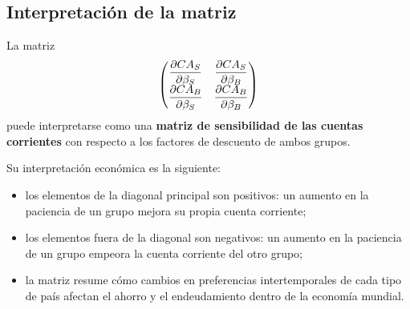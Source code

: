 \subsection*{Interpretación de la matriz}
La matriz
\[
\begin{pmatrix}
\dfrac{\partial CA_S}{\partial \beta_S} & \dfrac{\partial CA_S}{\partial \beta_B} \\
\dfrac{\partial CA_B}{\partial \beta_S} & \dfrac{\partial CA_B}{\partial \beta_B}
\end{pmatrix}
\]
puede interpretarse como una \textbf{matriz de sensibilidad de las cuentas corrientes} con respecto a los factores de descuento de ambos grupos.

Su interpretación económica es la siguiente:
\begin{itemize}[leftmargin=1.2cm]
    \item los elementos de la diagonal principal son positivos: un aumento en la paciencia de un grupo mejora su propia cuenta corriente;
    \item los elementos fuera de la diagonal son negativos: un aumento en la paciencia de un grupo empeora la cuenta corriente del otro grupo;
    \item la matriz resume cómo cambios en preferencias intertemporales de cada tipo de país afectan el ahorro y el endeudamiento dentro de la economía mundial.
\end{itemize}




